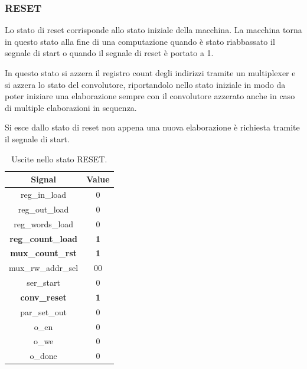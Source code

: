 \documentclass[a4paper]{report}
\begin{document}
\subsubsection{RESET}
Lo stato di reset corrisponde allo stato iniziale della macchina. La macchina torna in questo stato alla fine di una computazione quando è stato riabbassato il segnale di start o quando il segnale di reset è portato a 1.

In questo stato si azzera il registro count degli indirizzi tramite un multiplexer e si azzera lo stato del convolutore, riportandolo nello stato iniziale in modo da poter iniziare una elaborazione sempre con il convolutore azzerato anche in caso di multiple elaborazioni in sequenza.

Si esce dallo stato di reset non appena una nuova elaborazione è richiesta tramite il segnale di start.

\begin{table}[H]
  \centering
  \begin{tabular}{||c | c||} 
    \hline
    Signal & Value \\
    \hline\hline
    reg\_in\_load & 0 \\
    reg\_out\_load & 0 \\
    reg\_words\_load & 0 \\
    \textbf{reg\_count\_load} & \textbf{1} \\
    \textbf{mux\_count\_rst} & \textbf{1} \\
    mux\_rw\_addr\_sel & 00 \\
    ser\_start & 0 \\
    \textbf{conv\_reset} & \textbf{1} \\
    par\_set\_out & 0 \\
    o\_en & 0 \\
    o\_we & 0 \\
    o\_done & 0 \\
   \hline
  \end{tabular}
  \caption{Uscite nello stato RESET.}
  \label{table:1}
\end{table}
\end{document}
